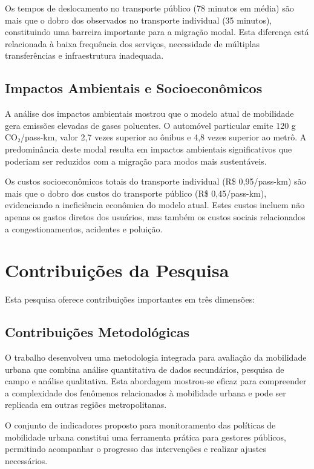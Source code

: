 Os tempos de deslocamento no transporte público (78 minutos em média) são mais que o dobro dos observados no transporte individual (35 minutos), constituindo uma barreira importante para a migração modal. Esta diferença está relacionada à baixa frequência dos serviços, necessidade de múltiplas transferências e infraestrutura inadequada.

\subsection{Impactos Ambientais e Socioeconômicos}

A análise dos impactos ambientais mostrou que o modelo atual de mobilidade gera emissões elevadas de gases poluentes. O automóvel particular emite 120 g CO₂/pass-km, valor 2,7 vezes superior ao ônibus e 4,8 vezes superior ao metrô. A predominância deste modal resulta em impactos ambientais significativos que poderiam ser reduzidos com a migração para modos mais sustentáveis.

Os custos socioeconômicos totais do transporte individual (R\$ 0,95/pass-km) são mais que o dobro dos custos do transporte público (R\$ 0,45/pass-km), evidenciando a ineficiência econômica do modelo atual. Estes custos incluem não apenas os gastos diretos dos usuários, mas também os custos sociais relacionados a congestionamentos, acidentes e poluição.

\section{Contribuições da Pesquisa}

Esta pesquisa oferece contribuições importantes em três dimensões:

\subsection{Contribuições Metodológicas}

O trabalho desenvolveu uma metodologia integrada para avaliação da mobilidade urbana que combina análise quantitativa de dados secundários, pesquisa de campo e análise qualitativa. Esta abordagem mostrou-se eficaz para compreender a complexidade dos fenômenos relacionados à mobilidade urbana e pode ser replicada em outras regiões metropolitanas.

O conjunto de indicadores proposto para monitoramento das políticas de mobilidade urbana constitui uma ferramenta prática para gestores públicos, permitindo acompanhar o progresso das intervenções e realizar ajustes necessários.

